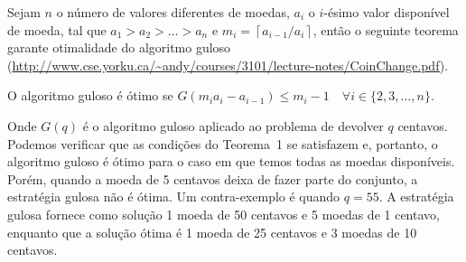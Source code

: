 \begin{questions}
\begin{solution}
Sejam $n$ o número de valores diferentes de moedas, $a_i$ o $i$-ésimo valor disponível de moeda, tal que $a_1 > a_2 > \dots > a_n$ e $m_i = \left\lceil a_{i-1}/a_i \right\rceil$, então o seguinte teorema garante otimalidade do algoritmo guloso (\url{http://www.cse.yorku.ca/~andy/courses/3101/lecture-notes/CoinChange.pdf}).
\begin{theorem}
	O algoritmo guloso é ótimo se $G(m_i a_i - a_{i-1}) \le m_i-1 \quad \forall i\in\{2,3,\dots,n\}$.
\end{theorem}
    Onde $G(q)$ é o algoritmo guloso aplicado ao problema de devolver $q$ centavos. Podemos verificar que as condições do Teorema~1 se satisfazem e, portanto, o algoritmo guloso é ótimo para o caso em que temos todas as moedas disponíveis. \\
    
    Porém, quando a moeda de 5 centavos deixa de fazer parte do conjunto, a estratégia gulosa não é ótima. Um contra-exemplo é quando $q = 55$. A estratégia gulosa fornece como solução 1 moeda de 50 centavos e 5 moedas de 1 centavo, enquanto que a solução ótima é 1 moeda de 25 centavos e 3 moedas de 10 centavos.
\end{solution}

\end{questions}
